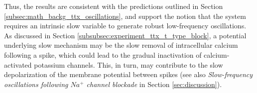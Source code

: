 \documentclass[../main.tex]{subfiles}
\begin{document}
Thus, the results are consistent with the predictions outlined in Section \ref{subsec:math_backg_ttx_oscillations}, and support the notion that the system requires an intrinsic slow variable to generate robust low-frequency oscillations. As discussed in Section \ref{subsubsec:experiment_ttx_t_type_block}, a potential underlying slow mechanism may be the slow removal of intracellular calcium following a spike, which could lead to the gradual inactivation of calcium-activated potassium channels. This, in turn, may contribute to the slow depolarization of the membrane potential between spikes (see also \textit{Slow-frequency oscillations following $Na^{+}$ channel blockade} in Section \ref{sec:discussion}).
\end{document}
